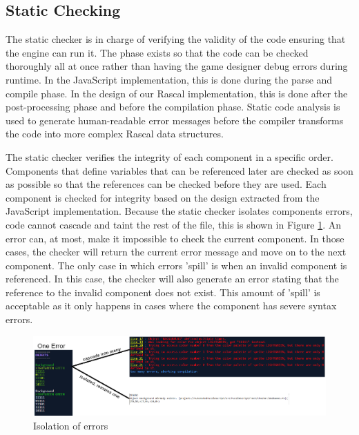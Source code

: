 \subsection{Static Checking}

The static checker is in charge of verifying the validity of the code ensuring that the engine can run it. The phase exists so that the code can be checked thoroughly all at once rather than having the game designer debug errors during runtime. In the JavaScript implementation, this is done during the parse and compile phase. In the design of our Rascal implementation, this is done after the post-processing phase and before the compilation phase\dd. Static code analysis is used to generate human-readable error messages before the compiler transforms the code into more complex Rascal data structures.

The static checker verifies the integrity of each component in a specific order. Components that define variables that can be referenced later are checked as soon as possible so that the references can be checked before they are used. Each component is checked for integrity based on the design extracted from the JavaScript implementation. Because the static checker isolates components errors, code cannot cascade and taint the rest of the file\dd, this is shown in Figure \ref{fig:checker_example}. An error can, at most, make it impossible to check the current component. In those cases, the checker will return the current error message and move on to the next component. The only case in which errors 'spill' is when an invalid component is referenced. In this case, the checker will also generate an error stating that the reference to the invalid component does not exist. This amount of 'spill' is acceptable as it only happens in cases where the component has severe syntax errors.

\begin{figure}[!t]
    \centering
    \includegraphics[width=1\textwidth]{images/Example checker.png}
    \caption{Isolation of errors}
    \label{fig:checker_example}
\end{figure}

